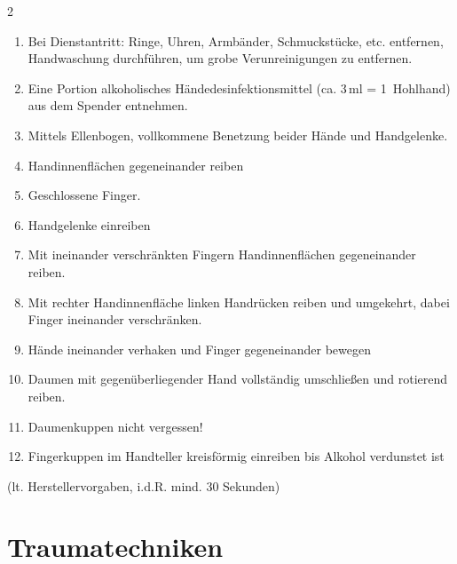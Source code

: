 \begin{gWideParEnv}
\begin{minipage}{\linewidth}
\begin{multicols}{2}
\begin{enumerate}
    \item Bei Dienstantritt: Ringe, Uhren, Armbänder,
    Schmuckstücke, etc. entfernen, Handwaschung
    durchführen, um grobe Verunreinigungen zu entfernen.
    \item Eine Portion alkoholisches
    Händedesinfektionsmittel (ca. 3\,ml = 1~Hohlhand) aus
    dem Spen\-der entnehmen.
    \item Mittels Ellenbogen, vollkommene Benetzung beider Hände und
    Handgelenke.
    \item Handinnenflächen gegeneinander reiben
    \item Geschlossene Finger.
    \item Handgelenke einreiben
    \item Mit ineinander verschränkten Fingern Handinnenflächen
    gegeneinander reiben.
    \item Mit rechter Handinnenfläche linken Handrücken reiben und
    umgekehrt, dabei Finger ineinander verschränken.
    \item Hände ineinander verhaken und Finger gegeneinander bewegen
    \item Daumen mit gegenüberliegender Hand vollständig umschließen
    und rotierend reiben.
    \item Daumenkuppen nicht vergessen!
    \item Fingerkuppen im Handteller kreisförmig einreiben bis Alkohol
    verdunstet ist
\end{enumerate}
 (lt. Herstellervorgaben, i.d.R. mind. 30 Sekunden) 
\end{multicols}
\end{minipage}
\end{gWideParEnv}

\nocite{KirschnickPflege2}



% 


\section{Traumatechniken}


